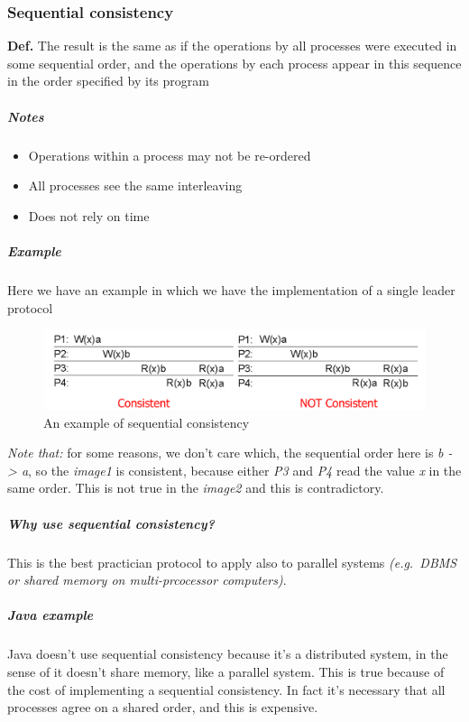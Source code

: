 \subsubsection{Sequential consistency}

\textbf{Def. } The result is the same as if the operations by all
processes were executed in some sequential order, and the operations by
each process appear in this sequence in the order specified by its
program

\subparagraph{Notes}

\begin{itemize}
    \item
      Operations within a process may not be re-ordered
    \item
      All processes see the same interleaving
    \item
      Does not rely on time
\end{itemize}

\subparagraph{\emph{Example}}\label{example}

Here we have an example in which we have the implementation of a single
leader protocol

\begin{figure}[htbp]
\centering
\includegraphics[width=\textwidth]{src/images/consistency-replication/sequential.png}
\caption{An example of sequential consistency}
\end{figure}

\emph{Note that:} for some reasons, we don't care which, the sequential
order here is \emph{b -\textgreater{} a}, so the \emph{image1} is
consistent, because either \emph{P3} and \emph{P4} read the value
\emph{x} in the same order. This is not true in the \emph{image2} and
this is contradictory.

\subparagraph{Why use sequential
consistency?}\label{why-use-sequential-consistency}

This is the best practician protocol to apply also to parallel systems
\emph{(e.g.~DBMS or shared memory on multi-prcocessor computers)}.

\subparagraph{\emph{Java example}}\label{java-example}

Java doesn't use sequential consistency because it's a distributed
system, in the sense of it doesn't share memory, like a parallel system.
This is true because of the cost of implementing a sequential
consistency. In fact it's necessary that all processes agree on a shared
order, and this is expensive.

